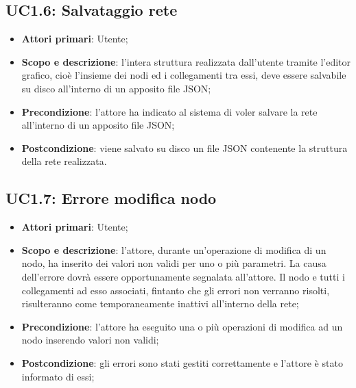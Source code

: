 \subsection{UC1.6: Salvataggio rete} 
\hypertarget{UC1.6}{} 
\begin{itemize} 
	\item{\textbf{Attori primari}: Utente;} 
	\item{\textbf{Scopo e descrizione}: l'intera struttura realizzata dall'utente tramite l'editor grafico, cioè l'insieme dei nodi ed i collegamenti tra essi, deve essere salvabile su disco all'interno di un apposito file JSON;} 
	\item{ \textbf{Precondizione}: l'attore ha indicato al sistema di voler salvare la rete all'interno di un apposito file JSON;} 
	\item{\textbf{Postcondizione}: viene salvato su disco un file JSON contenente la struttura della rete realizzata.} 
\end{itemize} 
\subsection{UC1.7: Errore modifica nodo}
\begin{itemize} 
	\item{\textbf{Attori primari}: Utente;} 
	\item{\textbf{Scopo e descrizione}: l'attore, durante un'operazione di modifica di un nodo, ha inserito dei valori non validi per uno o più parametri. La causa dell'errore dovrà essere opportunamente segnalata all'attore. Il nodo e tutti i collegamenti ad esso associati, fintanto che gli errori non verranno risolti, risulteranno come temporaneamente inattivi all'interno della rete;} 
	\item{\textbf{Precondizione}: l'attore ha eseguito una o più operazioni di modifica ad un nodo inserendo valori non validi;} 
	\item{\textbf{Postcondizione}: gli errori sono stati gestiti correttamente e l'attore è stato informato di essi;} 
\end{itemize}   

